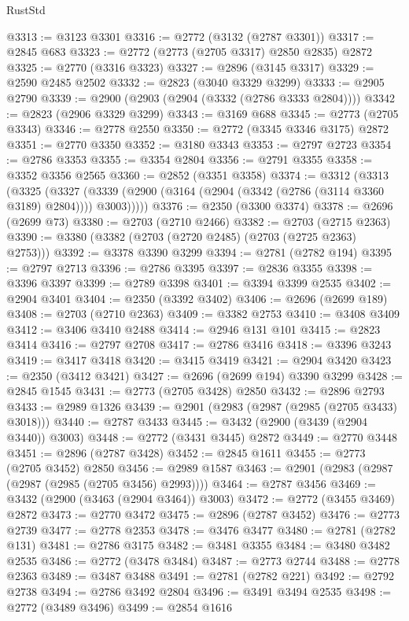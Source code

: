 \begin{lexlean}{RustStd}
\begin{coremodule}
@3313 := @3123 @3301
@3316 := @2772 (@3132 (@2787 @3301))
@3317 := @2845 @683
@3323 := @2772 (@2773 (@2705 @3317) @2850 @2835) @2872
@3325 := @2770 (@3316 @3323)
@3327 := @2896 (@3145 @3317)
@3329 := @2590 @2485 @2502
@3332 := @2823 (@3040 @3329 @3299)
@3333 := @2905 @2790
@3339 := @2900 (@2903 (@2904 (@3332 (@2786 @3333 @2804))))
@3342 := @2823 (@2906 @3329 @3299)
@3343 := @3169 @688
@3345 := @2773 (@2705 @3343)
@3346 := @2778 @2550
@3350 := @2772 (@3345 @3346 @3175) @2872
@3351 := @2770 @3350
@3352 := @3180 @3343
@3353 := @2797 @2723
@3354 := @2786 @3353
@3355 := @3354 @2804
@3356 := @2791 @3355
@3358 := @3352 @3356 @2565
@3360 := @2852 (@3351 @3358)
@3374 := @3312
    (@3313
      (@3325
        (@3327 (@3339 (@2900 (@3164 (@2904 (@3342 (@2786 (@3114 @3360 @3189) @2804)))) @3003)))))
@3376 := @2350 (@3300 @3374)
@3378 := @2696 (@2699 @73)
@3380 := @2703 (@2710 @2466)
@3382 := @2703 (@2715 @2363)
@3390 := @3380 (@3382 (@2703 (@2720 @2485) (@2703 (@2725 @2363) @2753)))
@3392 := @3378 @3390 @3299
@3394 := @2781 (@2782 @194)
@3395 := @2797 @2713
@3396 := @2786 @3395
@3397 := @2836 @3355
@3398 := @3396 @3397
@3399 := @2789 @3398
@3401 := @3394 @3399 @2535
@3402 := @2904 @3401
@3404 := @2350 (@3392 @3402)
@3406 := @2696 (@2699 @189)
@3408 := @2703 (@2710 @2363)
@3409 := @3382 @2753
@3410 := @3408 @3409
@3412 := @3406 @3410 @2488
@3414 := @2946 @131 @101
@3415 := @2823 @3414
@3416 := @2797 @2708
@3417 := @2786 @3416
@3418 := @3396 @3243
@3419 := @3417 @3418
@3420 := @3415 @3419
@3421 := @2904 @3420
@3423 := @2350 (@3412 @3421)
@3427 := @2696 (@2699 @194) @3390 @3299
@3428 := @2845 @1545
@3431 := @2773 (@2705 @3428) @2850
@3432 := @2896 @2793
@3433 := @2989 @1326
@3439 := @2901 (@2983 (@2987 (@2985 (@2705 @3433) @3018)))
@3440 := @2787 @3433
@3445 := @3432 (@2900 (@3439 (@2904 @3440)) @3003)
@3448 := @2772 (@3431 @3445) @2872
@3449 := @2770 @3448
@3451 := @2896 (@2787 @3428)
@3452 := @2845 @1611
@3455 := @2773 (@2705 @3452) @2850
@3456 := @2989 @1587
@3463 := @2901 (@2983 (@2987 (@2987 (@2985 (@2705 @3456) @2993))))
@3464 := @2787 @3456
@3469 := @3432 (@2900 (@3463 (@2904 @3464)) @3003)
@3472 := @2772 (@3455 @3469) @2872
@3473 := @2770 @3472
@3475 := @2896 (@2787 @3452)
@3476 := @2773 @2739
@3477 := @2778 @2353
@3478 := @3476 @3477
@3480 := @2781 (@2782 @131)
@3481 := @2786 @3175
@3482 := @3481 @3355
@3484 := @3480 @3482 @2535
@3486 := @2772 (@3478 @3484)
@3487 := @2773 @2744
@3488 := @2778 @2363
@3489 := @3487 @3488
@3491 := @2781 (@2782 @221)
@3492 := @2792 @2738
@3494 := @2786 @3492 @2804
@3496 := @3491 @3494 @2535
@3498 := @2772 (@3489 @3496)
@3499 := @2854 @1616

\end{coremodule}
\end{lexlean}

